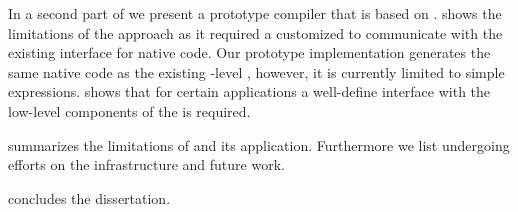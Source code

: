 \begin{description}
	In a second part of  we present \NBJ a prototype \JIT compiler that is based on \B.
	\NBJ shows the limitations of the \B approach as it required a customized \VM to communicate with the existing \JIT interface for native code.
	Our prototype implementation generates the same native code as the existing \VM-level \JIT, however, it is currently limited to simple expressions.
	\NBJ shows that for certain applications a well-define interface with the low-level components of the \VM is required.

\item[\chapref{future}] summarizes the limitations of \B and its application.
Furthermore we list undergoing efforts on the \B infrastructure and future work.

\item[\chapref{conclusion}] concludes the dissertation.

\end{description}


